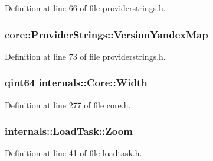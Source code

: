 Definition at line 66 of file providerstrings.\-h.

\hypertarget{group___o_p_map_widget_ga4e8dc0424dc67c6a4248f5bb6a770403}{
\subsubsection[{Version\-Yandex\-Map}]{ core\-::\-Provider\-Strings\-::\-Version\-Yandex\-Map}}\label{group___o_p_map_widget_ga4e8dc0424dc67c6a4248f5bb6a770403}


Definition at line 73 of file providerstrings.\-h.

\hypertarget{group___o_p_map_widget_ga3d5e76b481e1832dff58d33176b6a158}{
\subsubsection[{Width}]{\setlength{\rightskip}{0pt plus 5cm}qint64 internals\-::\-Core\-::\-Width\hspace{0.3cm}{\ttfamily [protected]}}}\label{group___o_p_map_widget_ga3d5e76b481e1832dff58d33176b6a158}


Definition at line 277 of file core.\-h.

\hypertarget{group___o_p_map_widget_gaee096bc3882220e2ed2b8b167cecb9ad}{
\subsubsection[{Zoom}]{ internals\-::\-Load\-Task\-::\-Zoom}}\label{group___o_p_map_widget_gaee096bc3882220e2ed2b8b167cecb9ad}


Definition at line 41 of file loadtask.\-h.



